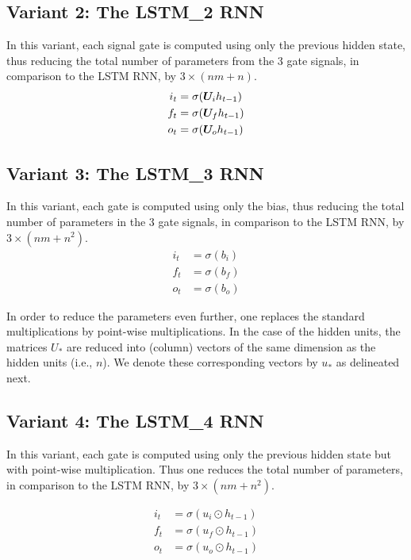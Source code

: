 \documentclass{article}
\begin{document}
\subsection{Variant 2: The LSTM\_2 RNN}
In this variant, each signal gate is computed using only the previous hidden state, thus reducing the total number of parameters from the 3 gate signals, in comparison to the LSTM RNN, by $3 \times (nm + n)$.
\begin{align}
	i_t &= \sigma({\bm{U}}_i h_{t-1})\\
	f_t &= \sigma({\bm{U}}_f h_{t-1})\\
	o_t &= \sigma({\bm{U}}_o h_{t-1})
\end{align}

\subsection{Variant 3: The LSTM\_3 RNN}
In this variant, each gate is computed using only the bias, thus reducing the total number of parameters in the 3 gate signals, in comparison to the LSTM RNN, by $3 \times (nm + n^2)$.
\begin{align}
	i_t &= \sigma(b_i)\\
	f_t &= \sigma(b_f)\\
	o_t &= \sigma(b_o)
\end{align}

In order to reduce the parameters even further, one replaces the standard multiplications by point-wise multiplications. In the case of the hidden units, the matrices $U_{*}$ are reduced into (column) vectors of the same dimension as the hidden units (i.e., $n$). We denote these corresponding vectors by $u_{*}$ as delineated next.

\subsection{Variant 4: The LSTM\_4 RNN}
In this variant, each gate is computed using only the previous hidden state but with point-wise multiplication. Thus one reduces  the total number of parameters, in comparison to the LSTM RNN, by $3 \times (nm + n^2)$.

\begin{align}
	i_t &= \sigma(u_i \odot  h_{t-1})\\
	f_t &= \sigma(u_f \odot h_{t-1})\\
	o_t &= \sigma(u_o \odot  h_{t-1})
\end{align}
\end{document}
